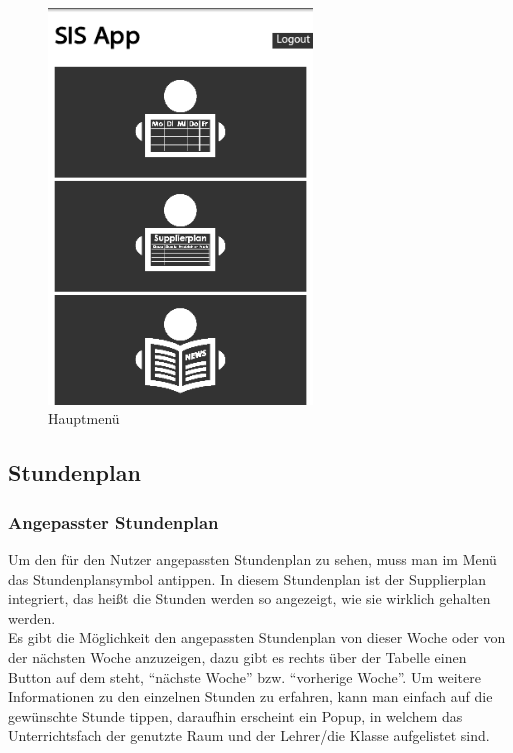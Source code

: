 \begin{figure}[H]
\centering
\includegraphics[keepaspectratio=true, width=7cm]{images/app_instructions/appMenu.png}
\caption{Hauptmenü}
\label{fig:App_Menu}
\end{figure}

\subsection{Stundenplan}
\subsubsection{Angepasster Stundenplan}
\label{sec:angepasster_stundenplan}
Um den für den Nutzer angepassten Stundenplan zu sehen, muss man im Menü das Stundenplansymbol antippen. In diesem Stundenplan ist der Supplierplan integriert, das heißt die Stunden werden so angezeigt, wie sie wirklich gehalten werden.\\
Es gibt die Möglichkeit den angepassten Stundenplan von dieser Woche oder von der nächsten Woche anzuzeigen, dazu gibt es rechts über der Tabelle einen Button auf dem steht, \enquote{nächste Woche} bzw. \enquote{vorherige Woche}.
Um weitere Informationen zu den einzelnen Stunden zu erfahren, kann man einfach auf die gewünschte Stunde tippen, daraufhin erscheint ein Popup, in welchem das Unterrichtsfach der genutzte Raum und der Lehrer/die Klasse aufgelistet sind.


